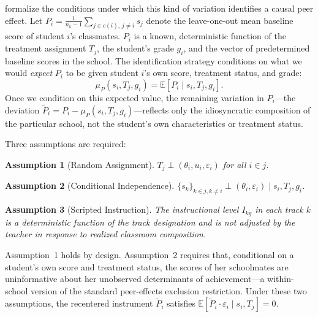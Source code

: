 \documentclass[11pt]{article}
\newtheorem{assumption}{Assumption}
\newcommand{\E}{\mathbb{E}}
\begin{document}
\citet{borusyak2023nonrandom} formalize the conditions under which this kind of variation identifies a causal peer effect. Let $P_i = \frac{1}{n_k - 1} \sum_{j \in c(i),\, j \neq i} s_j$ denote the leave-one-out mean baseline score of student $i$'s classmates. $P_i$ is a known, deterministic function of the treatment assignment $T_j$, the student's grade $g_i$, and the vector of predetermined baseline scores in the school. The identification strategy conditions on what we would \emph{expect} $P_i$ to be given student $i$'s own score, treatment status, and grade:
\begin{equation}
\mu_P(s_i, T_j, g_i) = \E[P_i \mid s_i, T_j, g_i].
\end{equation}
Once we condition on this expected value, the remaining variation in $P_i$---the deviation $\tilde{P}_i = P_i - \mu_P(s_i, T_j, g_i)$---reflects only the idiosyncratic composition of the particular school, not the student's own characteristics or treatment status.

Three assumptions are required:

\begin{assumption}[Random Assignment]
$T_j \perp (\theta_i, u_i, \varepsilon_i)$ for all $i \in j$.
\end{assumption}

\begin{assumption}[Conditional Independence]
$\{s_k\}_{k \in j, k \neq i} \perp (\theta_i, \varepsilon_i) \mid s_i, T_j, g_i$.
\end{assumption}

\begin{assumption}[Scripted Instruction]
The instructional level $I_{kg}$ in each track $k$ is a deterministic function of the track designation and is not adjusted by the teacher in response to realized classroom composition.
\end{assumption}

\noindent Assumption~1 holds by design. Assumption~2 requires that, conditional on a student's own score and treatment status, the scores of her schoolmates are uninformative about her unobserved determinants of achievement---a within-school version of the standard peer-effects exclusion restriction. Under these two assumptions, the recentered instrument $\tilde{P}_i$ satisfies $\E[\tilde{P}_i \cdot \varepsilon_i \mid s_i, T_j] = 0$.
\end{document}
